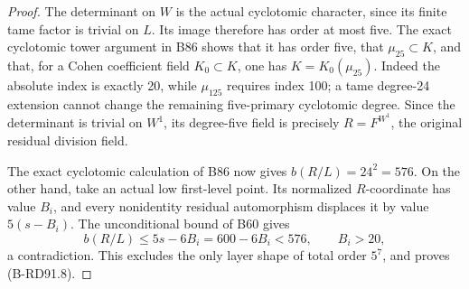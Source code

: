\begin{proof}
The determinant on \(W\) is the actual cyclotomic character,
since its finite tame factor is trivial on \(L\). Its image
therefore has order at most five. The exact cyclotomic tower
argument in B86 shows that it has order five, that
\(\mu_{25}\subset K\), and that, for a Cohen coefficient field
\(K_0\subset K\), one has \(K=K_0(\mu_{25})\). Indeed the
absolute index is exactly 20, while \(\mu_{125}\) requires
index 100; a tame degree-24 extension cannot change the remaining
five-primary cyclotomic degree. Since the determinant is trivial
on \(W^1\), its degree-five field is precisely
\(R=F^{W^1}\), the original residual division field.

The exact cyclotomic calculation of B86 now gives
\(b(R/L)=24^2=576\). On the other hand, take an actual low
first-level point. Its normalized \(R\)-coordinate has value
\(B_i\), and every nonidentity residual automorphism displaces
it by value \(5(s-B_i)\). The unconditional bound of B60 gives
\[
             b(R/L)\le5s-6B_i=600-6B_i<576,
                        \qquad B_i>20,                \tag{B-RD91.11}
\]
a contradiction. This excludes the only layer shape of total
order \(5^7\), and proves (B-RD91.8).
\end{proof}

